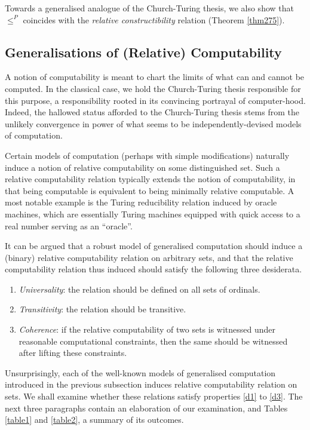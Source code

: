 \documentclass[12pt]{article}
\numberwithin{equation}{section}
\begin{document}
Towards a generalised analogue of the Church-Turing thesis, we also show that $\leq^P$ coincides with the \textit{relative constructibility} relation (Theorem \ref{thm275}). 

\subsection{Generalisations of (Relative) Computability}\label{subsec22}

A notion of computability is meant to chart the limits of what can and cannot be computed. In the classical case, we hold the Church-Turing thesis responsible for this purpose, a responsibility rooted in its convincing portrayal of computer-hood. Indeed, the hallowed status afforded to the Church-Turing thesis stems from the unlikely convergence in power of what seems to be independently-devised models of computation.

Certain models of computation (perhaps with simple modifications) naturally induce a notion of relative computability on some distinguished set. Such a relative computability relation typically extends the notion of computability, in that being computable is equivalent to being minimally relative computable. A most notable example is the Turing reducibility relation induced by oracle machines, which are essentially Turing machines equipped with quick access to a real number serving as an ``oracle''. 

It can be argued that a robust model of generalised computation should induce a (binary) relative computability relation on arbitrary sets, and that the relative computability relation thus induced should satisfy the following three desiderata.
\begin{enumerate}[leftmargin=40pt, label=(D\arabic*)]
    \item\label{d1} \textit{Universality}: the relation should be defined on all sets of ordinals.
    \item\label{d2} \textit{Transitivity}: the relation should be transitive.
    \item\label{d3} \textit{Coherence}: if the relative computability of two sets is witnessed under reasonable computational constraints, then the same should be witnessed after lifting these constraints.
\end{enumerate}
Unsurprisingly, each of the well-known models of generalised computation introduced in the previous subsection induces relative computability relation on sets. We shall examine whether these relations satisfy properties \ref{d1} to \ref{d3}. The next three paragraphs contain an elaboration of our examination, and Tables \ref{table1} and \ref{table2}, a summary of its outcomes.
\end{document}
